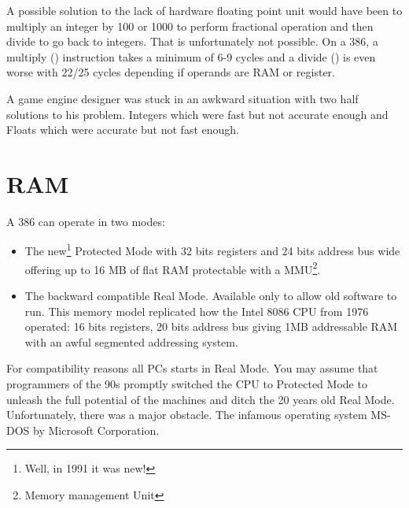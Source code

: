 \documentclass[book.tex]{subfiles}
\begin{document}
\par
A possible solution to the lack of hardware floating point unit would have been to multiply an integer by 100 or 1000 to perform fractional operation and then divide to go back to integers. That is unfortunately not possible. On a 386, a multiply () instruction takes a minimum of 6-9 cycles and a divide () is even worse with 22/25 cycles depending if operands are RAM or register.\\ 
\par
A game engine designer was stuck in an awkward situation with two half solutions to his problem. Integers which were fast but not accurate enough and Floats which were accurate but not fast enough.\\
\par
  















\section{RAM}
A 386 can operate in two modes:\\
\par
\begin{itemize}
  \item The new\footnote{Well, in 1991 it was new!} Protected Mode with  32 bits registers and 24 bits address bus wide offering up to 16 MB of flat RAM protectable with a MMU\footnote{Memory management Unit}.
  \item The backward compatible Real Mode. Available only to allow old software to run. This memory model replicated how the Intel 8086 CPU from 1976 operated: 16 bits registers, 20 bits address bus giving 1MB addressable RAM with an awful segmented addressing system. 
\end{itemize}
For compatibility reasons all PCs starts in Real Mode. You may assume that programmers of the 90s promptly switched the CPU to Protected Mode to unleash the full potential of the machines and ditch the 20 years old Real Mode. Unfortunately, there was a major obstacle. The infamous operating system MS-DOS by Microsoft Corporation.
  
\end{document}
